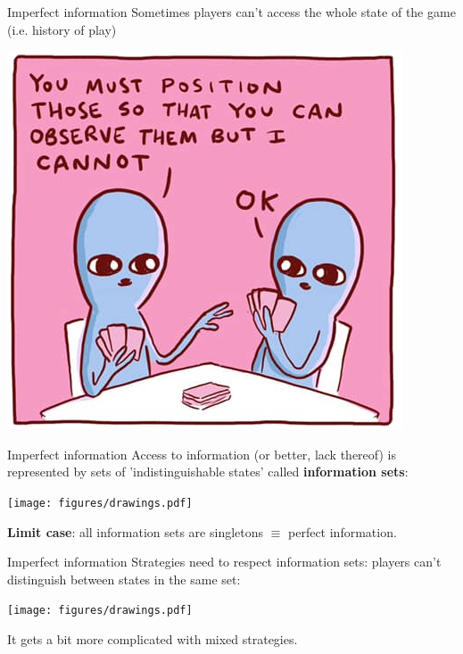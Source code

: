 \begin{frame}{Imperfect information}
	Sometimes players can't access the whole state of the game (i.e. history of play)

	\vfill
	\begin{center}
		\includegraphics[width=.65\textwidth]{figures/imperfect-information.png}
	\end{center}
\end{frame}

\begin{frame}{Imperfect information}
	Access to information (or better, lack thereof) is represented by sets of 'indistinguishable states' called \textcolor{coloragents}{\textbf{information sets}}:

	\begin{center}
		{\texttt{[image: figures/drawings.pdf]}}
	\end{center}


	\vfill
	\textbf{Limit case}: all information sets are singletons $\equiv$ perfect information.
\end{frame}

\begin{frame}{Imperfect information}
	\textcolor{coloragents}{Strategies} need to respect information sets: players can't distinguish between states in the same set:

	\begin{center}
		\texttt{[image: figures/drawings.pdf]}
	\end{center}

	\textcolor{colornote}{It gets a bit more complicated with mixed strategies.}
\end{frame}


